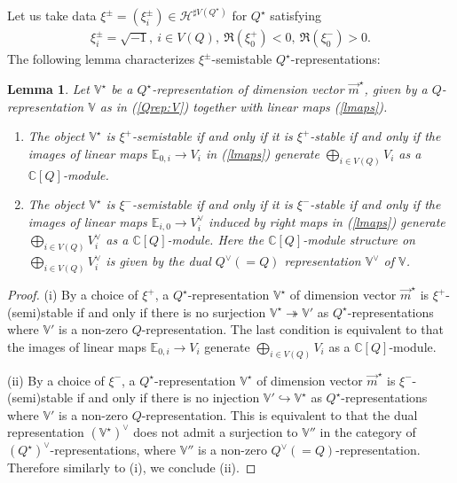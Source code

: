 \documentclass[11pt]{amsart}
\theoremstyle{plain}
\newtheorem{lem}[thm]{Lemma}
\theoremstyle{definition}
\theoremstyle{remark}
\newcommand{\hH}{\mathcal{H}}
\begin{document}
Let us take data
$\xi^{\pm}=(\xi^{\pm}_i) \in \hH^{\sharp V(Q^{\star})}$ 
for $Q^{\star}$ 
satisfying
\begin{align}\label{star:data}
\xi^{\pm}_{i}=\sqrt{-1}, \ i \in V(Q), \ 
\Re (\xi^{+}_0) <0, \
 \Re (\xi^{-}_0)>0.
\end{align}
The following lemma 
characterizes $\xi^{\pm}$-semistable 
$Q^{\star}$-representations:  
\begin{lem}\label{lem:xistab}
Let $\mathbb{V}^{\star}$ be a $Q^{\star}$-representation 
of dimension vector $\vec{m}^{\star}$, 
given by a $Q$-representation 
$\mathbb{V}$ as in (\ref{Qrep:V})
together with linear maps (\ref{lmaps}). 
\begin{enumerate}
\item The object $\mathbb{V}^{\star}$ is $\xi^{+}$-semistable
if and only if it is $\xi^{+}$-stable if and only if 
the images of linear maps 
$\mathbb{E}_{0, i} \to V_i$ in (\ref{lmaps}) generate
$\bigoplus_{i\in V(Q)}V_i$ as a $\mathbb{C}[Q]$-module. 

\item The object $\mathbb{V}^{\star}$ is $\xi^{-}$-semistable
if and only if it is $\xi^{-}$-stable if and only if 
the images of linear maps 
$\mathbb{E}_{i, 0} \to V_i^{\vee}$
induced by right maps in (\ref{lmaps}) generate
$\bigoplus_{i \in V(Q)}V_i^{\vee}$ 
as a $\mathbb{C}[Q]$-module.
Here the $\mathbb{C}[Q]$-module structure 
on $\bigoplus_{i\in V(Q)}V_i^{\vee}$
is given by the dual $Q^{\vee}(=Q)$
representation 
$\mathbb{V}^{\vee}$
of $\mathbb{V}$. 
\end{enumerate}
\end{lem}
\begin{proof}
(i) By a choice of $\xi^{+}$, a $Q^{\star}$-representation 
$\mathbb{V}^{\star}$
of dimension vector $\vec{m}^{\star}$ is $\xi^{+}$-(semi)stable 
if and only if there is no surjection 
$\mathbb{V}^{\star} \twoheadrightarrow \mathbb{V}'$ 
as $Q^{\star}$-representations
where $\mathbb{V}'$ 
is a non-zero $Q$-representation. 
The last condition is equivalent to that 
the images of linear maps $\mathbb{E}_{0, i} \to V_i$ 
generate $\bigoplus_{i\in V(Q)}V_i$
as a $\mathbb{C}[Q]$-module. 

(ii) By a choice of $\xi^{-}$, 
a $Q^{\star}$-representation 
$\mathbb{V}^{\star}$
of dimension vector $\vec{m}^{\star}$ is $\xi^{-}$-(semi)stable 
if and only if there is no injection
$\mathbb{V}' \hookrightarrow \mathbb{V}^{\star}$ 
as $Q^{\star}$-representations
where $\mathbb{V}'$
is a non-zero $Q$-representation.  
This is equivalent to that the dual representation 
$(\mathbb{V}^{\star})^{\vee}$
does not admit a surjection to $\mathbb{V}''$ 
in the category of $(Q^{\star})^{\vee}$-representations,
where 
$\mathbb{V}''$
is a non-zero $Q^{\vee}(=Q)$-representation. 
Therefore similarly to (i), we conclude (ii). 
\end{proof}
\end{document}
